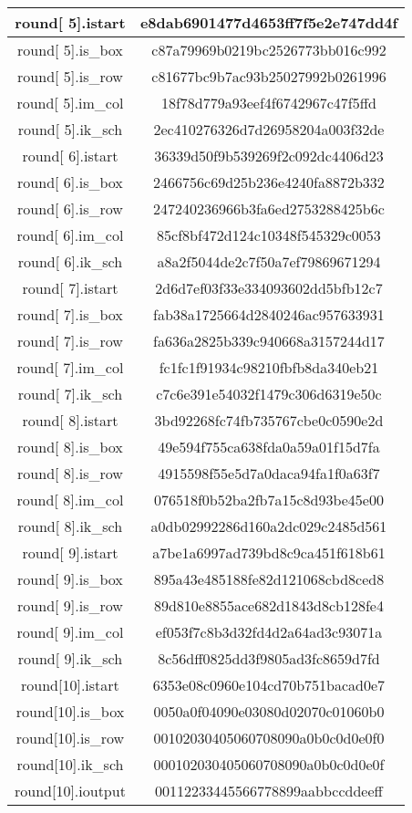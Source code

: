 \begin{center}
\begin{longtable}{|c|c|}
\hline
round[ 5].istart&   e8dab6901477d4653ff7f5e2e747dd4f\\
\hline
round[ 5].is\_box&   c87a79969b0219bc2526773bb016c992\\
\hline
round[ 5].is\_row&   c81677bc9b7ac93b25027992b0261996\\
\hline
round[ 5].im\_col&   18f78d779a93eef4f6742967c47f5ffd\\
\hline
round[ 5].ik\_sch&   2ec410276326d7d26958204a003f32de\\
\hline
round[ 6].istart&   36339d50f9b539269f2c092dc4406d23\\
\hline
round[ 6].is\_box&   2466756c69d25b236e4240fa8872b332\\
\hline
round[ 6].is\_row&   247240236966b3fa6ed2753288425b6c\\
\hline
round[ 6].im\_col&   85cf8bf472d124c10348f545329c0053\\
\hline
round[ 6].ik\_sch&   a8a2f5044de2c7f50a7ef79869671294\\
\hline
round[ 7].istart&   2d6d7ef03f33e334093602dd5bfb12c7\\
\hline
round[ 7].is\_box&   fab38a1725664d2840246ac957633931\\
\hline
round[ 7].is\_row&   fa636a2825b339c940668a3157244d17\\
\hline
round[ 7].im\_col&   fc1fc1f91934c98210fbfb8da340eb21\\
\hline
round[ 7].ik\_sch&   c7c6e391e54032f1479c306d6319e50c\\
\hline
round[ 8].istart&   3bd92268fc74fb735767cbe0c0590e2d\\
\hline
round[ 8].is\_box&   49e594f755ca638fda0a59a01f15d7fa\\
\hline
round[ 8].is\_row&   4915598f55e5d7a0daca94fa1f0a63f7\\
\hline
round[ 8].im\_col&   076518f0b52ba2fb7a15c8d93be45e00\\
\hline
round[ 8].ik\_sch&   a0db02992286d160a2dc029c2485d561\\
\hline
round[ 9].istart&   a7be1a6997ad739bd8c9ca451f618b61\\
\hline
round[ 9].is\_box&   895a43e485188fe82d121068cbd8ced8\\
\hline
round[ 9].is\_row&   89d810e8855ace682d1843d8cb128fe4\\
\hline
round[ 9].im\_col&   ef053f7c8b3d32fd4d2a64ad3c93071a\\
\hline
round[ 9].ik\_sch&   8c56dff0825dd3f9805ad3fc8659d7fd\\
\hline
round[10].istart&   6353e08c0960e104cd70b751bacad0e7\\
\hline
round[10].is\_box&   0050a0f04090e03080d02070c01060b0\\
\hline
round[10].is\_row&   00102030405060708090a0b0c0d0e0f0\\
\hline
round[10].ik\_sch&   000102030405060708090a0b0c0d0e0f\\
\hline
round[10].ioutput&  00112233445566778899aabbccddeeff\\
\hline
\end{longtable}
\end{center}


